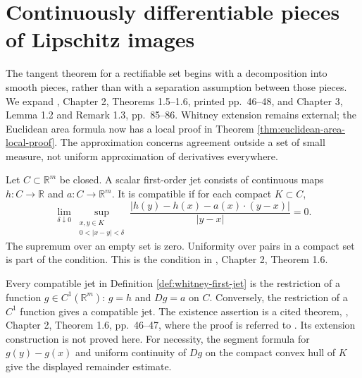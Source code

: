\chapter{Continuously differentiable pieces of Lipschitz images}\label{sec:rectifiable-c1-decomposition}
The tangent theorem for a rectifiable set begins with a decomposition into smooth pieces, rather than with a separation assumption between those pieces. We expand \cite{Sim18}, Chapter 2, Theorems 1.5--1.6, printed pp.~46--48, and Chapter 3, Lemma 1.2 and Remark 1.3, pp.~85--86. Whitney extension remains external; the Euclidean area formula now has a local proof in Theorem \ref{thm:euclidean-area-local-proof}. The approximation concerns agreement outside a set of small measure, not uniform approximation of derivatives everywhere.

\begin{definition}\label{def:whitney-first-jet}
Let $C\subset\mathbb R^m$ be closed. A scalar first-order jet consists of continuous maps $h:C\to\mathbb R$ and $a:C\to\mathbb R^m$. It is compatible if for each compact $K\subset C$,
\[
 \lim_{\delta\downarrow0}\sup_{\substack{x,y\in K\\0<|x-y|<\delta}}
 \frac{|h(y)-h(x)-a(x)\cdot(y-x)|}{|y-x|}=0.
\]
The supremum over an empty set is zero. Uniformity over pairs in a compact set is part of the condition. This is the condition in \cite{Sim18}, Chapter 2, Theorem 1.6.
\end{definition}

\begin{theorem}\label{thm:whitney-c1-extension}
Every compatible jet in Definition \ref{def:whitney-first-jet} is the restriction of a function $g\in C^1(\mathbb R^m)$: $g=h$ and $Dg=a$ on $C$. Conversely, the restriction of a $C^1$ function gives a compatible jet. The existence assertion is a cited theorem, \cite{Sim18}, Chapter 2, Theorem 1.6, pp.~46--47, where the proof is referred to \cite{Fed69}. Its extension construction is not proved here. For necessity, the segment formula for $g(y)-g(x)$ and uniform continuity of $Dg$ on the compact convex hull of $K$ give the displayed remainder estimate.
\end{theorem}

